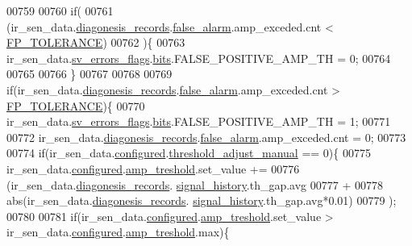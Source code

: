 \begin{DoxyCode}
00759 
00760                 \textcolor{keywordflow}{if}(
00761                   (ir\_sen\_data.\hyperlink{a00023_a7ae905b560513ad201e58c2f63375030}{diagonesis\_records}.\hyperlink{a00017_a799f50625c0c03f9404a59287810113d}{false\_alarm}.amp\_exceded.cnt 
      < \hyperlink{a00017_a946f0acff4fd16a65859479e9e0b9513}{FP\_TOLERANCE})
00762                  )\{
00763                   ir\_sen\_data.\hyperlink{a00023_aaeec6b0609dba31393f337abf1cce3d3}{sv\_errors\_flags}.\hyperlink{a00022_ab81eb6fb4f1351ed07b4d6c4dd6f1959}{bits}.FALSE\_POSITIVE\_AMP\_TH  = 0;
00764 
00765            
00766                   \}
00767 
00768 
00769                 \textcolor{keywordflow}{if}(ir\_sen\_data.\hyperlink{a00023_a7ae905b560513ad201e58c2f63375030}{diagonesis\_records}.\hyperlink{a00017_a799f50625c0c03f9404a59287810113d}{false\_alarm}.amp\_exceded.cnt 
      > \hyperlink{a00017_a946f0acff4fd16a65859479e9e0b9513}{FP\_TOLERANCE})\{
00770                   ir\_sen\_data.\hyperlink{a00023_aaeec6b0609dba31393f337abf1cce3d3}{sv\_errors\_flags}.\hyperlink{a00022_ab81eb6fb4f1351ed07b4d6c4dd6f1959}{bits}.FALSE\_POSITIVE\_AMP\_TH = 1;
00771 
00772                   ir\_sen\_data.\hyperlink{a00023_a7ae905b560513ad201e58c2f63375030}{diagonesis\_records}.\hyperlink{a00017_a799f50625c0c03f9404a59287810113d}{false\_alarm}.amp\_exceded.cnt =
       0;
00773    
00774                  \textcolor{keywordflow}{if}(ir\_sen\_data.\hyperlink{a00023_a94b2d1f6ea4ab334c74d24984dd27843}{configured}.\hyperlink{a00021_a18e270a10094f045f20299b0f7e83085}{threshold\_adjust\_manual} == 0)\{
00775                          ir\_sen\_data.\hyperlink{a00023_a94b2d1f6ea4ab334c74d24984dd27843}{configured}.\hyperlink{a00021_a4b3bbfb0267daea1432f2603825ade62}{amp\_treshold}.set\_value  +=
00776                          (ir\_sen\_data.\hyperlink{a00023_a7ae905b560513ad201e58c2f63375030}{diagonesis\_records}.
      \hyperlink{a00017_affb63906d23cb1cb7787d61eaaedfb60}{signal\_history}.th\_gap.avg
00777                           +
00778                          abs(ir\_sen\_data.\hyperlink{a00023_a7ae905b560513ad201e58c2f63375030}{diagonesis\_records}.
      \hyperlink{a00017_affb63906d23cb1cb7787d61eaaedfb60}{signal\_history}.th\_gap.avg*0.01)
00779                          );
00780 
00781                          \textcolor{keywordflow}{if}(ir\_sen\_data.\hyperlink{a00023_a94b2d1f6ea4ab334c74d24984dd27843}{configured}.\hyperlink{a00021_a4b3bbfb0267daea1432f2603825ade62}{amp\_treshold}.set\_value > 
      ir\_sen\_data.\hyperlink{a00023_a94b2d1f6ea4ab334c74d24984dd27843}{configured}.\hyperlink{a00021_a4b3bbfb0267daea1432f2603825ade62}{amp\_treshold}.max)\{

\end{DoxyCode}
